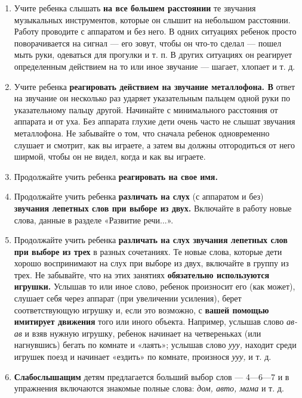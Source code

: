 \documentclass[a5paper]{book}
\renewcommand{\emph}[1]{\textit{#1}}
\begin{document}
\begin{enumerate}
\def\labelenumi{\arabic{enumi}.}
\item
  
  Учите ребенка слышать \textbf{на все большем расстоянии} те звучания
  музыкальных инструментов, которые он слышит на небольшом расстоянии.
  Работу проводите с аппаратом и без него. В одних ситуациях ребенок
  просто поворачивается на сигнал --- его зовут, чтобы он что-то сделал
  --- пошел мыть руки, одеваться для прогулки и т. п. В других ситуациях
  он реагирует определенным действием на то или иное звучание ---
  шагает, хлопает и т. д.
  
\item
  
  Учите ребенка \textbf{реагировать действием на звучание металлофона.
  В} ответ на звучание он несколько раз ударяет указательным пальцем
  одной руки по указательному пальцу другой. Начинайте с минимального
  расстояния от аппарата и от уха. Без аппарата глухие дети очень часто
  не слышат звучания металлофона. Не забывайте о том, что сначала
  ребенок одновременно слушает и смотрит, как вы играете, а затем вы
  должны отгородиться от него ширмой, чтобы он не видел, когда и как вы
  играете.
  
\item
  
  Продолжайте учить ребенка \textbf{реагировать на свое имя.}
  
\item
  
  Продолжайте учить ребенка \textbf{различать на слух} (с аппаратом и
  без) \textbf{звучания лепетных слов при выборе из двух.} Включайте в
  работу новые слова, данные в разделе «Развитие речи...».
  
\item
  
  Продолжайте учить ребенка \textbf{различать на слух звучания лепетных
  слов при выборе из трех} в разных сочетаниях. Те новые слова, которые
  дети хорошо воспринимают на слух при выборе из двух, включайте в
  группу из трех. Не забывайте, что на этих занятиях \textbf{обязательно
  используются игрушки.} Услышав то или иное слово, ребенок произносит
  его (как может), слушает себя через аппарат (при увеличении усиления),
  берет соответствующую игрушку и, если это возможно, с \textbf{вашей
  помощью имитирует движения} того или иного объекта. Например, услышав
  слово \emph{ав-ав} и взяв нужную игрушку, ребенок начинает на
  четвереньках (или нагнувшись) бегать по комнате и «лаять»; услышав
  слово \emph{ууу,} находит среди игрушек поезд и начинает «ездить» по
  комнате, произнося \emph{ууу,} и т. д.
  
\item
  
  \textbf{Слабослышащим} детям предлагается больший выбор слов ---
  4---6---7 и в упражнения включаются знакомые полные слова: \emph{дом,
  авто, мама} и т. д.
  
\end{enumerate}
\end{document}
